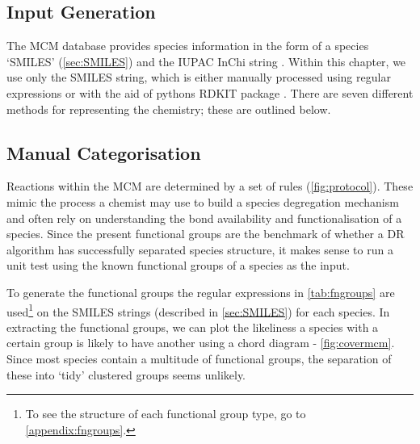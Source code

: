\subsection{Input Generation}
The MCM database provides species information in the form of a species `SMILES' (\autoref{sec:SMILES}) and the IUPAC InChi string \citep{inchi}. Within this chapter, we use only the SMILES string, which is either manually processed using regular expressions or with the aid of pythons RDKIT package \citep{rdkit}. There are seven different methods for representing the chemistry; these are outlined below.


\subsection{Manual Categorisation}
Reactions within the MCM are determined by a set of rules (\autoref{fig:protocol}). These mimic the process a chemist may use to build a species degregation mechanism and often rely on understanding the bond availability and functionalisation of a species. Since the present functional groups are the benchmark of whether a DR algorithm has successfully separated species structure, it makes sense to run a unit test using the known functional groups of a species as the input.

To generate the functional groups the regular expressions in \autoref{tab:fngroups} are used\footnote{To see the structure of each functional group type, go to \autoref{appendix:fngroups}.} on the SMILES strings (described in \autoref{sec:SMILES}) for each species. In extracting the functional groups, we can plot the likeliness a species with a certain group is likely to have another using a chord diagram - \autoref{fig:covermcm}. Since most species contain a multitude of functional groups, the separation of these into `tidy' clustered groups seems unlikely.


%



